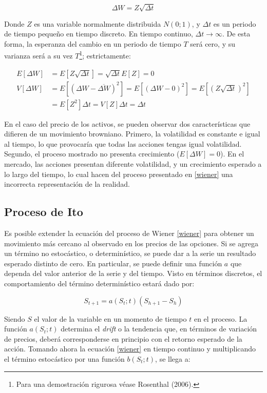 \begin{equation}
	\Delta W = Z \sqrt{\Delta t} \label{wiener}
\end{equation}

Donde $Z$ es una variable normalmente distribuida $N(0;1)$, y $\Delta t$ es un periodo de tiempo pequeño en tiempo discreto. En tiempo continuo, $\Delta t \rightarrow \infty$. De esta forma, la esperanza del cambio en un periodo de tiempo $T$ será cero, y su varianza será a su vez $T$\footnote{Para una demostración rigurosa véase Rosenthal (2006).}; estrictamente:

\begin{align}
E[\Delta W] &= E[Z \sqrt{\Delta t}] = \sqrt{\Delta t} E[Z] = 0 \nonumber\\
V[\Delta W] &= E[(\Delta W - \overline{\Delta W})^2] = E[(\Delta W - 0)^2] = E[(Z \sqrt{\Delta t})^2] \nonumber\\
	&= E[Z^2] \Delta t =  V[Z] \Delta t = \Delta t\nonumber
\end{align}

En el caso del precio de los activos, se pueden observar dos características que difieren de un movimiento browniano. Primero, la volatilidad es constante e igual al tiempo, lo que provocaría que todas las acciones tengas igual volatilidad. Segundo, el proceso mostrado no presenta crecimiento ($E[\Delta W]=0$). En el mercado, las acciones presentan diferente volatilidad, y un crecimiento esperado a lo largo del tiempo, lo cual hacen del proceso presentado en \eqref{wiener} una incorrecta representación de la realidad.


\subsection{Proceso de Ito}

Es posible extender la ecuación del proceso de Wiener \eqref{wiener} para obtener un movimiento más cercano al observado en los precios de las opciones. Si se agrega un término no estocástico, o determinístico, se puede dar a la serie un resultado esperado distinto de cero. En particular, se puede definir una función $a$ que dependa del valor anterior de la serie y del tiempo. Visto en términos discretos, el comportamiento del término determinístico estará dado por:

\begin{equation}
	S_{t+1} = a(S_{t};t) (S_{h+1} - S_{h})
\end{equation}

Siendo $S$ el valor de la variable en un momento de tiempo $t$ en el proceso. La función $a(S_{t};t)$ determina el \textit{drift} o la tendencia que, en términos de variación de precios, deberá corresponderse en principio con el retorno esperado de la acción. Tomando ahora la ecuación \eqref{wiener} en tiempo continuo y multiplicando el término estocástico por una función $b(S_{t};t)$, se llega a:

